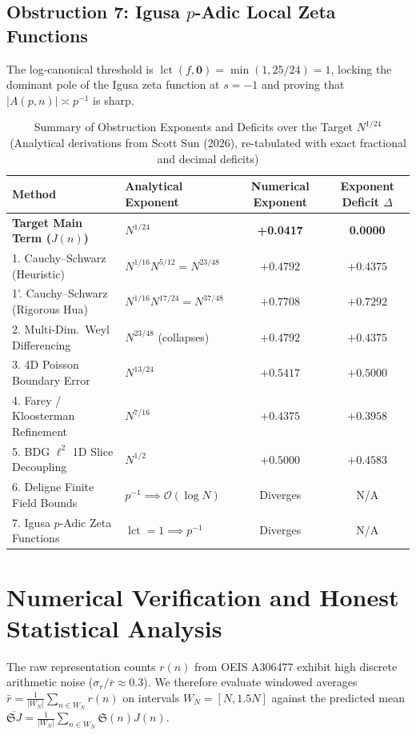 \documentclass[11pt, a4paper]{article}
\theoremstyle{plain}
\theoremstyle{definition}
\begin{document}
\subsection{Obstruction 7: Igusa $p$-Adic Local Zeta Functions}
The log-canonical threshold is $\operatorname{lct}(f,\mathbf{0}) = \min(1, 25/24) = 1$, locking the dominant pole of the Igusa zeta function at $s = -1$ and proving that $|A(p,n)| \asymp p^{-1}$ is sharp.

\begin{table}[htbp]
\centering
\caption{Summary of Obstruction Exponents and Deficits over the Target $N^{1/24}$ (Analytical derivations from Scott Sun (2026), re-tabulated with exact fractional and decimal deficits)}
\label{tab:obstructions}
\begin{tabular}{@{}llcc@{}}
\toprule
Method & Analytical Exponent & Numerical Exponent & Exponent Deficit $\Delta$ \\
\midrule
\textbf{Target Main Term ($J(n)$)} & $N^{1/24}$ & \textbf{+0.0417} & \textbf{0.0000} \\
\midrule
1. Cauchy--Schwarz (Heuristic) & $N^{1/16} N^{5/12} = N^{23/48}$ & $+0.4792$ & $+0.4375$ \\
1'. Cauchy--Schwarz (Rigorous Hua) & $N^{1/16} N^{17/24} = N^{37/48}$ & $+0.7708$ & $+0.7292$ \\
2. Multi-Dim.\ Weyl Differencing & $N^{23/48}$ (collapses) & $+0.4792$ & $+0.4375$ \\
3. 4D Poisson Boundary Error & $N^{13/24}$ & $+0.5417$ & $+0.5000$ \\
4. Farey / Kloosterman Refinement & $N^{7/16}$ & $+0.4375$ & $+0.3958$ \\
5. BDG $\ell^2$ 1D Slice Decoupling & $N^{1/2}$ & $+0.5000$ & $+0.4583$ \\
6. Deligne Finite Field Bounds & $p^{-1} \implies \mathcal{O}(\log N)$ & Diverges & N/A \\
7. Igusa $p$-Adic Zeta Functions & $\operatorname{lct} = 1 \implies p^{-1}$ & Diverges & N/A \\
\bottomrule
\end{tabular}
\end{table}

\section{Numerical Verification and Honest Statistical Analysis}
\label{sec:numerics}

The raw representation counts $r(n)$ from OEIS A306477 exhibit high discrete arithmetic noise ($\sigma_r / \bar{r} \approx 0.3$). We therefore evaluate windowed averages $\bar{r} = \frac{1}{|W_N|} \sum_{n \in W_N} r(n)$ on intervals $W_N = [N, 1.5N]$ against the predicted mean $\overline{\mathfrak{S}J} = \frac{1}{|W_N|} \sum_{n \in W_N} \mathfrak{S}(n) J(n)$.
\end{document}
